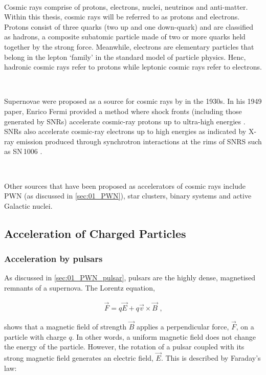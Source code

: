 \par~\par
Cosmic rays comprise of protons, electrons, nuclei, neutrinos and anti-matter. Within this thesis, cosmic rays will be referred to as protons and electrons. Protons consist of three quarks (two up and one down-quark) and are classified as hadrons, a composite subatomic particle made of two or more quarks held together by the strong force. Meanwhile, electrons are elementary particles that belong in the lepton `family' in the standard model of particle physics. Henc, hadronic cosmic rays refer to protons while leptonic cosmic rays refer to electrons.
\par~\par 
Supernovae were proposed as a source for cosmic rays by \cite{1934PNAS...20..259B} in the 1930s. In his 1949 paper, Enrico Fermi provided a method where shock fronts (including those generated by SNRs) accelerate cosmic-ray protons up to ultra-high energies \citep{1949PhRv...75.1169F}. SNRs also accelerate cosmic-ray electrons up to high energies as indicated by X-ray emission produced through synchrotron interactions at the rims of SNRS such as \mbox{SN\,1006} \citep{1995Natur.378..255K}.
\par~\par
Other sources that have been proposed as accelerators of cosmic rays include PWN (as discussed in \autoref{sec:01_PWN}), star clusters, binary systems and active Galactic nuclei.

\subsection{Acceleration of Charged Particles}

\subsubsection{Acceleration by pulsars}

As discussed in \autoref{sec:01_PWN_pulsar}, pulsars are the highly dense, magnetised remnants of a supernova. The Lorentz equation,

\begin{equation}
    \begin{aligned}
        \vec{F}=q\vec{E} + q\vec{v}\times \vec{B}\text{ ,}
    \end{aligned} \label{eq:chapter_1_lorentz_force}
\end{equation}

\noindent shows that a magnetic field of strength $\vec{B}$ applies a perpendicular force, $\vec{F}$, on a particle with charge $q$. In other words, a uniform magnetic field does not change the energy of the particle. However, the rotation of a pulsar coupled with its strong magnetic field generates an electric field, $\vec{E}$. This is described by Faraday's law:
 
